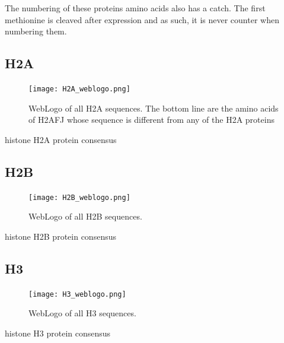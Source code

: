 \documentclass[10pt,a4paper,draft]{article}
\newcommand{\rewrite}[2][]{\todo[inline,color=green!40,caption={chunk of text to be rewritten}#1]{#2}} %
\begin{document}
    The numbering of these proteins amino acids also has a catch. The first methionine is cleaved after expression and as such, it is
    never counter when numbering them.

    \subsection{H2A}
      \begin{figure}
        \centering
        \texttt{[image: H2A\_weblogo.png]}
        \caption{WebLogo of all H2A sequences. The bottom line are the amino acids of H2AFJ whose sequence is different from any of the H2A proteins}
        \label{fig:h2a-weblogo}
      \end{figure}

      \begin{table}
        \centering
        
        \caption{histone H2A protein consensus}
        \label{tab:H2A-consensus}
      \end{table}

      \rewrite{comment on H2AFJ}

    \subsection{H2B}
      \begin{figure}
        \centering
        \texttt{[image: H2B\_weblogo.png]}
        \caption{WebLogo of all H2B sequences.}
        \label{fig:h2b-weblogo}
      \end{figure}
      \begin{table}
        \centering
        
        \caption{histone H2B protein consensus}
        \label{tab:H2B-consensus}
      \end{table}

    \subsection{H3}
      \begin{figure}
        \centering
        \texttt{[image: H3\_weblogo.png]}
        \caption{WebLogo of all H3 sequences.}
        \label{fig:h3-weblogo}
      \end{figure}
      \begin{table}
        \centering
        
        \caption{histone H3 protein consensus}
        \label{tab:H3-consensus}
      \end{table}
\end{document}
